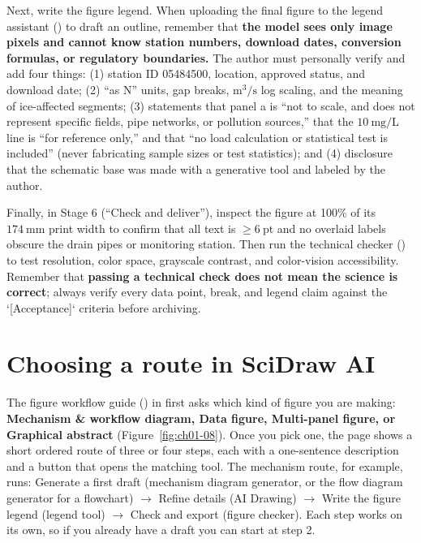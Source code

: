 Next, write the figure legend. When uploading the final figure to the legend assistant () to draft an outline, remember that \textbf{the model sees only image pixels and cannot know station numbers, download dates, conversion formulas, or regulatory boundaries.} The author must personally verify and add four things: (1) station ID 05484500, location, approved status, and download date; (2) ``as N'' units, gap breaks, $\text{m}^3/\text{s}$ log scaling, and the meaning of ice-affected segments; (3) statements that panel a is ``not to scale, and does not represent specific fields, pipe networks, or pollution sources,'' that the $10\ \text{mg/L}$ line is ``for reference only,'' and that ``no load calculation or statistical test is included'' (never fabricating sample sizes or test statistics); and (4) disclosure that the schematic base was made with a generative tool and labeled by the author.

Finally, in Stage 6 (``Check and deliver''), inspect the figure at 100\% of its $174\ \text{mm}$ print width to confirm that all text is $\ge 6\ \text{pt}$ and no overlaid labels obscure the drain pipes or monitoring station. Then run the technical checker () to test resolution, color space, grayscale contrast, and color-vision accessibility. Remember that \textbf{passing a technical check does not mean the science is correct}; always verify every data point, break, and legend claim against the `[Acceptance]` criteria before archiving.

\section{Choosing a route in SciDraw AI}

The figure workflow guide () in \scidraw{} first asks which kind of figure you are making: \textbf{Mechanism \& workflow diagram, Data figure, Multi-panel figure, or Graphical abstract} (Figure~\ref{fig:ch01-08}). Once you pick one, the page shows a short ordered route of three or four steps, each with a one-sentence description and a button that opens the matching tool. The mechanism route, for example, runs: Generate a first draft (mechanism diagram generator, or the flow diagram generator for a flowchart) $\rightarrow$ Refine details (AI Drawing) $\rightarrow$ Write the figure legend (legend tool) $\rightarrow$ Check and export (figure checker). Each step works on its own, so if you already have a draft you can start at step 2.

